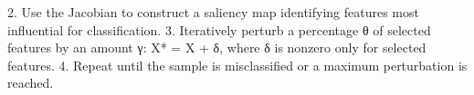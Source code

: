 
2. Use the Jacobian to construct a saliency map identifying features most influential for classification.
3. Iteratively perturb a percentage θ of selected features by an amount γ: X* = X + δ, where δ is nonzero only for selected features.
4. Repeat until the sample is misclassified or a maximum perturbation is reached.
